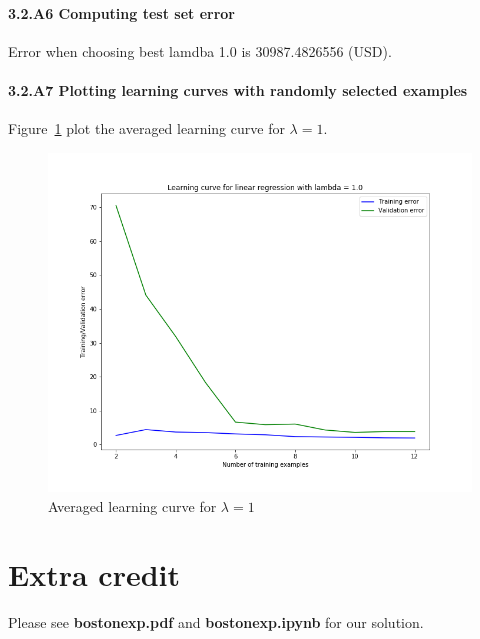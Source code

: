 \documentclass[english,11pt]{article}
\begin{document}
\subsection*{3.2.A6 Computing test set error}
Error when choosing best lamdba  1.0  is  30987.4826556 (USD).

\subsection*{3.2.A7 Plotting learning curves with randomly selected examples}
Figure~\ref{fig:3_2_A7} plot the averaged learning curve for $\lambda = 1$.

\begin{figure}[h]
\centering
\includegraphics[width=.6\textwidth]{../hw1/part2/fig3_2_A7.png}
\caption{Averaged learning curve for $\lambda = 1$}
\label{fig:3_2_A7}
\end{figure}


\part*{Extra credit}
Please see \textbf{bostonexp.pdf} and \textbf{bostonexp.ipynb} for our solution.
\end{document}

